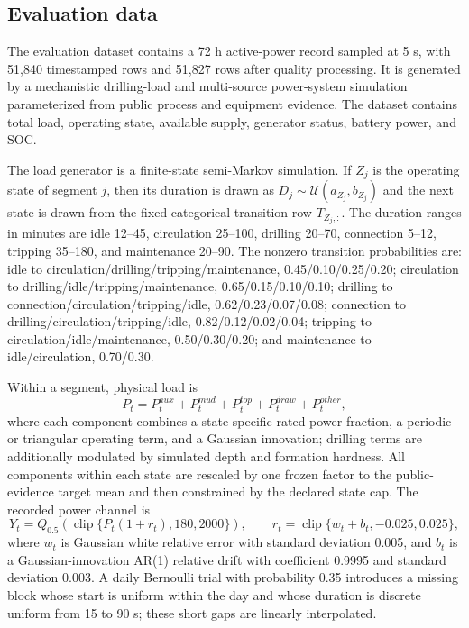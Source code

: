 \subsection{Evaluation data}\label{evaluation-data}

The evaluation dataset contains a 72 h active-power record sampled at 5 s,
with 51,840 timestamped rows and 51,827 rows after quality processing. It is
generated by a mechanistic drilling-load and multi-source power-system
simulation parameterized from public process and equipment evidence. The
dataset contains total load, operating state, available supply, generator
status, battery power, and SOC.

The load generator is a finite-state semi-Markov simulation. If $Z_j$ is the
operating state of segment $j$, then its duration is drawn as
$D_j\sim\mathcal U(a_{Z_j},b_{Z_j})$ and the next state is drawn from the fixed
categorical transition row $T_{Z_j,:}$. The duration ranges in minutes are
idle 12--45, circulation 25--100, drilling 20--70, connection 5--12, tripping
35--180, and maintenance 20--90. The nonzero transition probabilities are:
idle to circulation/drilling/tripping/maintenance, 0.45/0.10/0.25/0.20;
circulation to drilling/idle/tripping/maintenance, 0.65/0.15/0.10/0.10;
drilling to connection/circulation/tripping/idle, 0.62/0.23/0.07/0.08;
connection to drilling/circulation/tripping/idle, 0.82/0.12/0.02/0.04;
tripping to circulation/idle/maintenance, 0.50/0.30/0.20; and maintenance to
idle/circulation, 0.70/0.30.

Within a segment, physical load is
\begin{equation}
\label{eq:simulated-load}
P_t=P^{aux}_t+P^{mud}_t+P^{top}_t+P^{draw}_t+P^{other}_t,
\end{equation}
where each component combines a state-specific rated-power fraction, a
periodic or triangular operating term, and a Gaussian innovation; drilling
terms are additionally modulated by simulated depth and formation hardness.
All components within each state are rescaled by one frozen factor to the
public-evidence target mean and then constrained by the declared state cap.
The recorded power channel is
\begin{equation}
\label{eq:simulated-measurement}
Y_t=Q_{0.5}\!\left(\operatorname{clip}\{P_t(1+r_t),180,2000\}\right),\qquad
r_t=\operatorname{clip}\{w_t+b_t,-0.025,0.025\},
\end{equation}
where $w_t$ is Gaussian white relative error with standard deviation 0.005,
and $b_t$ is a Gaussian-innovation AR(1) relative drift with coefficient
0.9995 and standard deviation 0.003. A daily Bernoulli trial with probability
0.35 introduces a missing block whose start is uniform within the day and
whose duration is discrete uniform from 15 to 90 s; these short gaps are
linearly interpolated.

